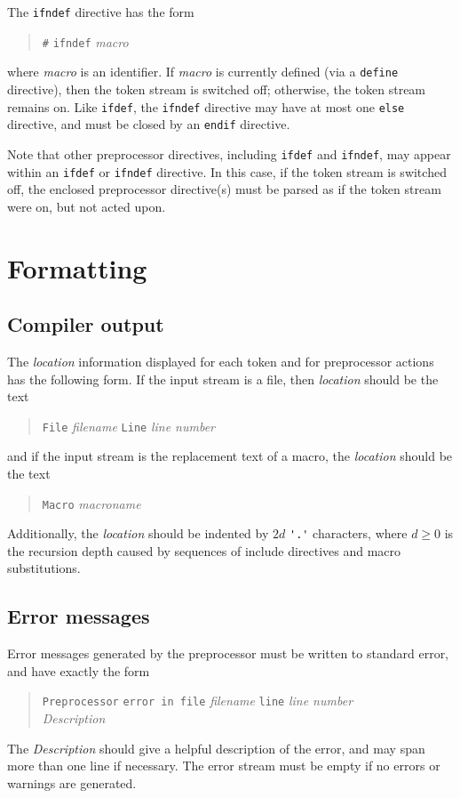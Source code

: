 \documentclass{article}
\begin{document}
The \verb|ifndef| directive has the form
\begin{quote}
  \verb|#| \verb|ifndef| \emph{macro}
\end{quote}
where \emph{macro} is an identifier.
If \emph{macro} is currently defined
(via a \verb|define| directive),
then the token stream is switched off;
otherwise, the token stream remains on.
Like \verb|ifdef|, the \verb|ifndef| directive
may have at most one \verb|else| directive,
and must be closed by an \verb|endif| directive.

Note that other preprocessor directives,
including \verb|ifdef| and \verb|ifndef|,
may appear within an \verb|ifdef| or \verb|ifndef| directive.
In this case, if the token stream is switched off,
the enclosed preprocessor directive(s) must be
parsed as if the token stream were on,
but not acted upon.


\section{Formatting}

\subsection{Compiler output}

The \emph{location} information displayed for each token
and for preprocessor actions
has the following form.
If the input stream is a file,
then \emph{location} should be the text
\begin{quote}
  \verb|File| \emph{filename} \verb|Line| \emph{line number}
\end{quote}
and if the input stream is the replacement text of a macro,
the \emph{location} should be the text
\begin{quote}
  \verb|Macro| \emph{macroname}
\end{quote}
Additionally, the \emph{location} should be indented
by $2d$ \verb|'.'| characters,
where $d \ge 0$ is the recursion depth
caused by sequences of include directives and macro substitutions.

\subsection{Error messages}

Error messages generated by the preprocessor must
be written to standard error,
and have exactly the form
\begin{quote}
	\begin{tabbing}
		{\tt Preprocessor} \= {\tt error in file} \emph{filename}
		{\tt line} \emph{line number}
	\\
		\> \emph{Description}
	\end{tabbing}
\end{quote}
The \emph{Description} should give a helpful description of the error,
and may span more than one line if necessary.
The error stream must be empty if no errors or warnings are generated.
\end{document}
